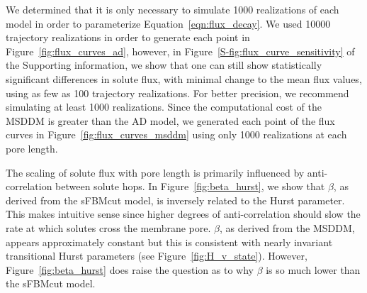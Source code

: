 \documentclass{article}
\begin{document}
  

  We determined that it is only necessary to simulate 1000 realizations of each model
  in order to parameterize Equation~\ref{eqn:flux_decay}. We used 10000 trajectory
  realizations in order to generate each point in Figure~\ref{fig:flux_curves_ad}, 
  however, in Figure~\ref{S-fig:flux_curve_sensitivity} of the Supporting information,
  we show that one can still show statistically significant differences in solute 
  flux, with minimal change to the mean flux values, using as few as 100 trajectory
  realizations. 
  For better precision, we recommend simulating at least 1000 realizations. 
  Since the computational cost of the MSDDM is greater than the AD model, we generated
  each point of the flux curves in Figure~\ref{fig:flux_curves_msddm} using only 1000
  realizations at each pore length. 
  
  The scaling of solute flux with pore length is primarily influenced by anti-correlation
  between solute hops. In Figure~\ref{fig:beta_hurst}, we show that $\beta$, as derived 
  from the sFBMcut model, is inversely related to the Hurst parameter. This makes intuitive
  sense since higher degrees of anti-correlation should slow the rate at which solutes
  cross the membrane pore. $\beta$, as derived from the MSDDM, appears approximately 
  constant but this is consistent with nearly invariant transitional Hurst parameters
  (see Figure~\ref{fig:H_v_state}). However, Figure~\ref{fig:beta_hurst} does raise
  the question as to why $\beta$ is so much lower than the sFBMcut model.
  
\end{document}
